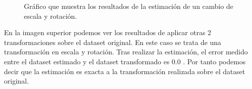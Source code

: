 \begin{figure}
\begin{center}
\hspace{0.5cm}

\end{center}

\caption{Gráfico que muestra los resultados de la estimación de un cambio de escala y rotación.}
\end{figure}
En la imagen superior podemos ver los resultados de aplicar otras 2 transformaciones sobre el dataset original. En este caso se trata de una transformación en escala y rotación.
Tras realizar la estimación, el error medido entre el dataset estimado y el dataset transformado es 0.0 . Por tanto podemos decir que la estimación es exacta a la transformación realizada sobre el dataset original.

